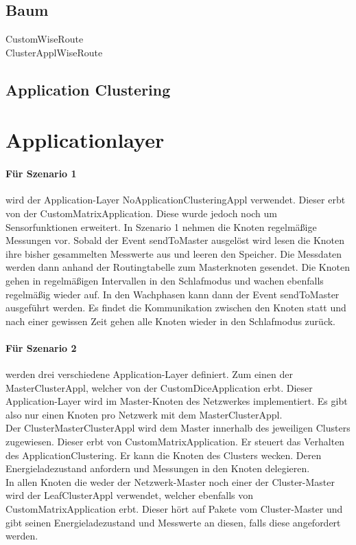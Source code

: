 \subsection{Baum}
CustomWiseRoute\\
ClusterApplWiseRoute
\subsection{Application Clustering}

\section{Applicationlayer}

\paragraph{Für Szenario 1} wird der Application-Layer NoApplicationClusteringAppl verwendet. Dieser erbt von der CustomMatrixApplication. Diese wurde jedoch noch um  Sensorfunktionen erweitert. In Szenario 1 nehmen die Knoten regelmäßige Messungen vor. Sobald der Event sendToMaster ausgelöst wird lesen die Knoten ihre bisher gesammelten Messwerte aus und leeren den Speicher. Die Messdaten werden dann anhand der Routingtabelle zum Masterknoten gesendet. Die Knoten gehen in regelmäßigen Intervallen in den Schlafmodus und wachen ebenfalls regelmäßig wieder auf. In den Wachphasen kann dann der Event sendToMaster ausgeführt werden. Es findet die Kommunikation zwischen den Knoten statt und nach einer gewissen Zeit gehen alle Knoten wieder in den Schlafmodus zurück.

\paragraph{Für Szenario 2} werden drei verschiedene Application-Layer definiert. Zum einen der MasterClusterAppl, welcher von der CustomDiceApplication erbt. Dieser Application-Layer wird im Master-Knoten des Netzwerkes implementiert. Es gibt also nur einen Knoten pro Netzwerk mit dem MasterClusterAppl.\\
Der ClusterMasterClusterAppl wird dem Master innerhalb des jeweiligen Clusters zugewiesen. Dieser erbt von CustomMatrixApplication. Er steuert das Verhalten des ApplicationClustering. Er kann die Knoten des Clusters wecken. Deren Energieladezustand anfordern und Messungen in den Knoten delegieren.\\
In allen Knoten die weder der Netzwerk-Master noch einer der Cluster-Master wird der LeafClusterAppl verwendet, welcher ebenfalls von CustomMatrixApplication erbt.   Dieser hört auf Pakete vom Cluster-Master und gibt seinen Energieladezustand und Messwerte an diesen, falls diese angefordert werden.


